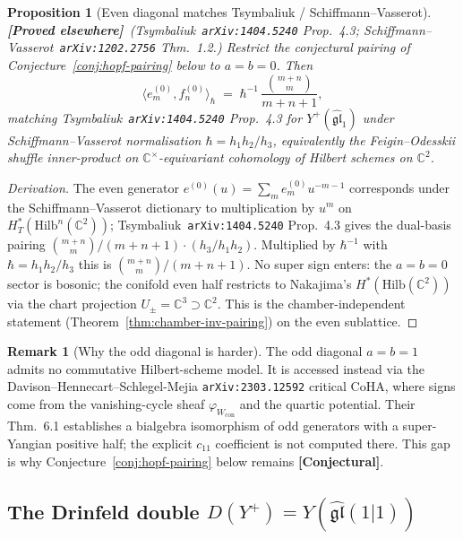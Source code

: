 \documentclass[11pt]{amsart}
\newtheorem{proposition}[theorem]{Proposition}
\theoremstyle{definition}
\newtheorem{remark}[theorem]{Remark}
\providecommand{\bC}{\mathbb{C}}
\providecommand{\fgl}{\mathfrak{gl}}
\providecommand{\ClaimStatusProvedElsewhere}{\textbf{\textsf{[Proved elsewhere]}}}
\providecommand{\ClaimStatusConjectured}{\textbf{\textsf{[Conjectural]}}}
\begin{document}
\begin{proposition}[Even diagonal matches Tsymbaliuk / Schiffmann--Vasserot]
\label{prop:cycle4-even-diagonal}
\ClaimStatusProvedElsewhere\
\emph{(Tsymbaliuk~\texttt{arXiv:1404.5240} Prop.~4.3;
Schiffmann--Vasserot~\texttt{arXiv:1202.2756} Thm.~1.2.)}
Restrict the conjectural pairing of Conjecture~\ref{conj:hopf-pairing}
below to $a = b = 0$. Then
\[
  \langle e^{(0)}_m, f^{(0)}_n\rangle_\hbar
  \;=\; \hbar^{-1}\,\frac{\binom{m+n}{m}}{m+n+1},
\]
matching Tsymbaliuk~\texttt{arXiv:1404.5240} Prop.~4.3 for
$Y^+(\widehat{\fgl}_1)$ under Schiffmann--Vasserot normalisation
$\hbar = h_1 h_2 / h_3$, equivalently the Feigin--Odesskii shuffle
inner-product on $\bC^\times$-equivariant cohomology of Hilbert schemes
on $\bC^2$.
\end{proposition}

\begin{proof}[Derivation]
The even generator $e^{(0)}(u) = \sum_m e^{(0)}_m u^{-m-1}$ corresponds
under the Schiffmann--Vasserot dictionary to multiplication by $u^m$ on
$H^*_T(\mathrm{Hilb}^n(\bC^2))$; Tsymbaliuk~\texttt{arXiv:1404.5240}
Prop.~4.3 gives the dual-basis pairing
$\binom{m+n}{m}/(m+n+1)\cdot(h_3/h_1 h_2)$. Multiplied by $\hbar^{-1}$
with $\hbar = h_1 h_2/h_3$ this is $\binom{m+n}{m}/(m+n+1)$. No super
sign enters: the $a = b = 0$ sector is bosonic; the conifold even half
restricts to Nakajima's $H^*(\mathrm{Hilb}(\bC^2))$ via the chart
projection $U_\pm = \bC^3 \supset \bC^2$. This is the chamber-independent
statement (Theorem~\ref{thm:chamber-inv-pairing}) on the even sublattice.
\end{proof}

\begin{remark}[Why the odd diagonal is harder]
\label{rem:cycle4-odd-harder}
The odd diagonal $a = b = 1$ admits no commutative Hilbert-scheme model.
It is accessed instead via the Davison--Hennecart--Schlegel-Mejia
\texttt{arXiv:2303.12592} critical CoHA, where signs come from the
vanishing-cycle sheaf $\varphi_{W_{\mathrm{con}}}$ and the quartic
potential. Their Thm.~6.1 establishes a bialgebra isomorphism of odd
generators with a super-Yangian positive half; the explicit $c_{11}$
coefficient is not computed there. This gap is why
Conjecture~\ref{conj:hopf-pairing} below remains \ClaimStatusConjectured.
\end{remark}

\subsection{The Drinfeld double $D(Y^+) = Y(\widehat{\fgl}(1|1))$}
\label{subsec:cycle5-drinfeld-double}
\end{document}

